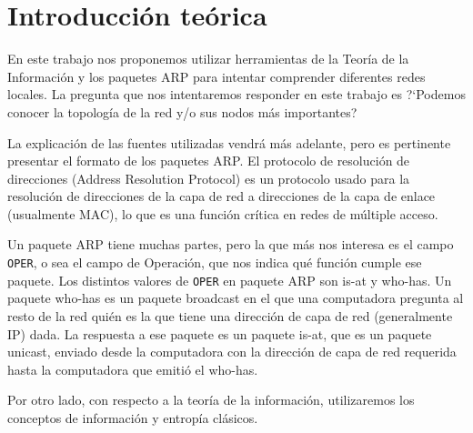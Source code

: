 \section{Introducci\'on te\'orica}

\PARstart En este trabajo nos proponemos utilizar herramientas de la Teor\'ia de la Informaci\'on y los paquetes ARP para intentar comprender diferentes redes locales. La pregunta que nos intentaremos responder en este trabajo es ?`Podemos conocer la topolog\'ia de la red y/o sus nodos m\'as importantes?

La explicaci\'on de las fuentes utilizadas vendr\'a m\'as adelante, pero es pertinente presentar el formato de los paquetes ARP. El protocolo de resoluci\'on de direcciones (Address Resolution Protocol) \cite{arp} es un protocolo usado para la resoluci\'on de direcciones de la capa de red a direcciones de la capa de enlace (usualmente MAC), lo que es una funci\'on cr\'itica en redes de m\'ultiple acceso.

Un paquete ARP tiene muchas partes, pero la que m\'as nos interesa es el campo \texttt{OPER}, o sea el campo de Operaci\'on, que nos indica qu\'e funci\'on cumple ese paquete. 
Los distintos valores de \texttt{OPER} en paquete ARP son is-at y who-has. 
Un paquete who-has es un paquete broadcast en el que una computadora pregunta al resto de la red qui\'en es la que tiene una direcci\'on de capa de red (generalmente IP) dada.
La respuesta a ese paquete es un paquete is-at, que es un paquete unicast, enviado desde la computadora con la direcci\'on de capa de red requerida hasta la computadora que emiti\'o el who-has.

Por otro lado, con respecto a la teor\'ia de la informaci\'on, utilizaremos los conceptos de informaci\'on y entrop\'ia cl\'asicos.

